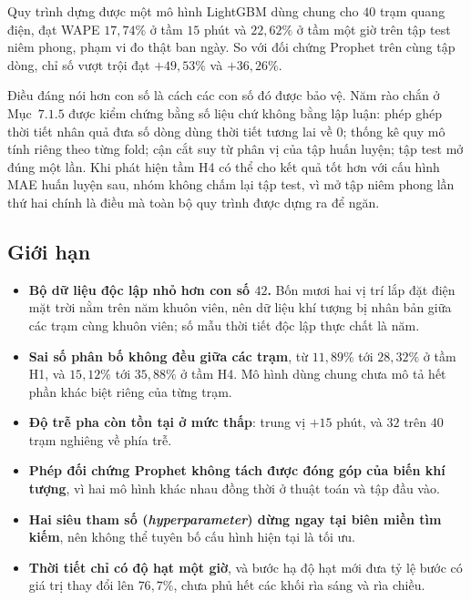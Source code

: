 Quy trình dựng được một mô hình LightGBM dùng chung cho $40$ trạm quang điện, đạt WAPE
$17{,}74\%$ ở tầm $15$ phút và $22{,}62\%$ ở tầm một giờ trên tập test niêm phong, phạm vi đo
thật ban ngày. So với đối chứng Prophet trên cùng tập dòng, chỉ số vượt trội đạt $+49{,}53\%$
và $+36{,}26\%$.

Điều đáng nói hơn con số là cách các con số đó được bảo vệ. Năm rào chắn ở Mục~$7.1.5$ được kiểm
chứng bằng số liệu chứ không bằng lập luận: phép ghép thời tiết nhân quả đưa số dòng dùng thời
tiết tương lai về $0$; thống kê quy mô tính riêng theo từng fold; cận cắt suy từ phân vị của
tập huấn luyện; tập test mở đúng một lần. Khi phát hiện tầm H4 có thể cho kết quả tốt hơn với
cấu hình MAE huấn luyện sau, nhóm không chấm lại tập test, vì mở tập niêm phong lần thứ hai
chính là điều mà toàn bộ quy trình được dựng ra để ngăn.

\FloatBarrier
\subsection{Giới hạn}

\begin{itemize}
    \item \textbf{Bộ dữ liệu độc lập nhỏ hơn con số $42$.} Bốn mươi hai vị trí lắp đặt điện mặt trời nằm trên
    năm khuôn viên, nên dữ liệu khí tượng bị nhân bản giữa các trạm cùng khuôn viên; số mẫu
    thời tiết độc lập thực chất là năm.
    \item \textbf{Sai số phân bố không đều giữa các trạm}, từ $11{,}89\%$ tới $28{,}32\%$ ở
    tầm H1, và $15{,}12\%$ tới $35{,}88\%$ ở tầm H4. Mô hình dùng chung chưa mô tả hết phần khác
    biệt riêng của từng trạm.
    \item \textbf{Độ trễ pha còn tồn tại ở mức thấp}: trung vị $+15$ phút, và $32$ trên $40$
    trạm nghiêng về phía trễ.
    \item \textbf{Phép đối chứng Prophet không tách được đóng góp của biến khí tượng}, vì hai
    mô hình khác nhau đồng thời ở thuật toán và tập đầu vào.
    \item \textbf{Hai siêu tham số (\textit{hyperparameter}) dừng ngay tại biên miền tìm kiếm}, nên không thể tuyên bố
    cấu hình hiện tại là tối ưu.
    \item \textbf{Thời tiết chỉ có độ hạt một giờ}, và bước hạ độ hạt mới đưa tỷ lệ
    bước có giá trị thay đổi lên $76{,}7\%$, chưa phủ hết các khối rìa sáng và rìa chiều.
\end{itemize}

\FloatBarrier
